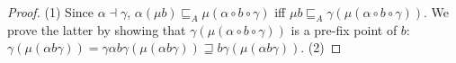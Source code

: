 \documentclass{llncs}
\begin{document}
\begin{proof}
(1) Since $\alpha \dashv \gamma$, $\alpha(\mu b) \sqsubseteq_A \mu (\alpha \circ b \circ \gamma)$ iff $\mu b \sqsubseteq_A \gamma(\mu (\alpha \circ b \circ \gamma))$. We prove the 
latter by showing that  $\gamma(\mu (\alpha \circ b \circ \gamma))$ is a pre-fix point of $b$: $\gamma(\mu (\alpha b \gamma)) = \gamma \alpha  b  \gamma(\mu (\alpha  b  \gamma)) \sqsupseteq b \gamma(\mu (\alpha  b  \gamma))$. (2)

\end{proof}


\end{document}
